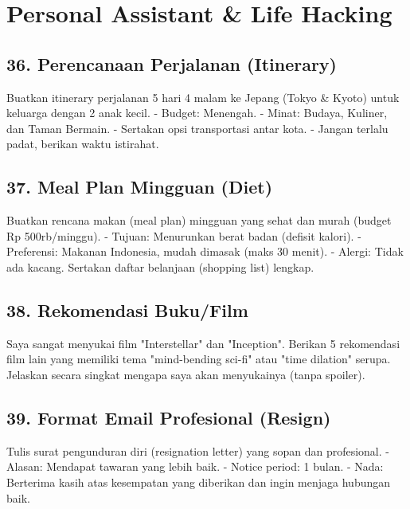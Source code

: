 \section{Personal Assistant & Life Hacking}

\subsection{36. Perencanaan Perjalanan (Itinerary)}
\begin{promptbox}
Buatkan itinerary perjalanan 5 hari 4 malam ke Jepang (Tokyo & Kyoto) untuk keluarga dengan 2 anak kecil.
- Budget: Menengah.
- Minat: Budaya, Kuliner, dan Taman Bermain.
- Sertakan opsi transportasi antar kota.
- Jangan terlalu padat, berikan waktu istirahat.
\end{promptbox}

\subsection{37. Meal Plan Mingguan (Diet)}
\begin{promptbox}
Buatkan rencana makan (meal plan) mingguan yang sehat dan murah (budget Rp 500rb/minggu).
- Tujuan: Menurunkan berat badan (defisit kalori).
- Preferensi: Makanan Indonesia, mudah dimasak (maks 30 menit).
- Alergi: Tidak ada kacang.
Sertakan daftar belanjaan (shopping list) lengkap.
\end{promptbox}

\subsection{38. Rekomendasi Buku/Film}
\begin{promptbox}
Saya sangat menyukai film "Interstellar" dan "Inception".
Berikan 5 rekomendasi film lain yang memiliki tema "mind-bending sci-fi" atau "time dilation" serupa.
Jelaskan secara singkat mengapa saya akan menyukainya (tanpa spoiler).
\end{promptbox}

\subsection{39. Format Email Profesional (Resign)}
\begin{promptbox}
Tulis surat pengunduran diri (resignation letter) yang sopan dan profesional.
- Alasan: Mendapat tawaran yang lebih baik.
- Notice period: 1 bulan.
- Nada: Berterima kasih atas kesempatan yang diberikan dan ingin menjaga hubungan baik.
\end{promptbox}

